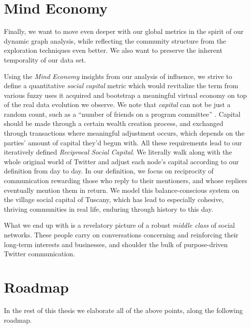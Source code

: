 \documentclass[10pt,oneside]{memoir}
\begin{document}
\pagebreak \section{Mind Economy}
\label{mindeconomy}

Finally, we want to move even deeper with our global metrics in the spirit of our dynamic graph analysis, while reflecting the community structure from the exploration techniques even better.  We also want to preserve the inherent temporality of our data set.


Using the {\itshape Mind Economy} insights from our analysis of influence, we strive to define a quantitative {\itshape social capital} metric which would revitalize the term from various fuzzy uses it acquired and bootstrap a meaningful virtual economy on top of the real data evolution we observe.  We note that {\itshape capital} can not be just a random count, such as a ``number of friends on a program committee'' \cite{Licamele:2005:Benefit}.  Capital should be made through a certain wealth creation process, and exchanged through transactions where meaningful adjustment occurs, which depends on the parties' amount of capital they'd begun with.  All these requirements lead to our iteratively defined {\itshape Reciprocal Social Capital}.  We literally walk along with the whole original world of Twitter and adjust each node's capital according to our definition from day to day.  In our definition, we focus on reciprocity of communication rewarding those who reply to their mentioners, and whose repliers eventually mention them in return.  We model this balance-conscious system on the village social capital of Tuscany, which has lead to especially cohesive, thriving communities in real life, enduring through history to this day.


What we end up with is a revelatory picture of a robust {\itshape middle class} of social networks.  These people carry on conversations concerning and reinforcing their long-term interests and businesses, and shoulder the bulk of purpose-driven Twitter communication.


\pagebreak \section{Roadmap}
\label{roadmap}

In the rest of this thesis we elaborate all of the above points, along the following roadmap.
\end{document}
